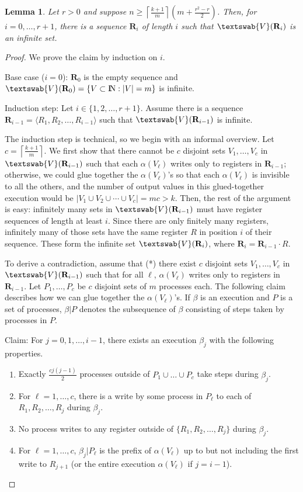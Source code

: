 \documentclass[11pt]{article}
\newtheorem{lemma}[theorem]{Lemma}
\newcommand{\gV}{\textswab{V}}
\newcommand{\bR}{\mathbf{R}}
\newcommand{\ceil}[1]{\left\lceil #1 \right\rceil}
\newcommand{\nat}{{\rm I\!N}}
\newcounter{ind}
\begin{document}
\begin{lemma}
\label{anonymous-gluing}
Let $r>0$ and
suppose $n\geq \ceil{\frac{k+1}{m}}(m+\frac{r^2-r}{2})$.  Then,
for $i=0,\ldots,r+1$, there is a sequence $\bR_i$ of length $i$ such that 
$\gV(\bR_i)$ is an infinite set.
\end{lemma}

\begin{proof}
We prove the claim by induction on $i$.  

Base case ($i=0$):  $\bR_0$ is the empty sequence and  $\gV(\bR_0) = \{V\subset \nat : |V|=m\}$ is infinite.

Induction step:  Let $i\in \{1,2,\ldots,r+1\}$.  Assume there is a sequence $\bR_{i-1}=\langle R_1, R_2, \ldots, R_{i-1}\rangle$ such that $\gV(\bR_{i-1})$ is infinite.

The induction step is  technical, so we begin with an informal overview.
Let $c=\ceil{\frac{k+1}{m}}$.
We first show that there cannot be $c$ disjoint sets $V_1,\ldots,V_c$ in $\gV(\bR_{i-1})$ such that each $\alpha(V_\ell)$ writes only to registers in $\bR_{i-1}$; otherwise, we could glue together the $\alpha(V_\ell)$'s so that each $\alpha(V_\ell)$ is invisible to all the others, and 
the number of  output values in this glued-together execution would be
$|V_1\cup V_2\cup \cdots \cup V_c| = mc >k$.
Then, the rest of the argument is easy:  infinitely many sets in
$\gV(\bR_{i-1})$ must have register sequences of length at least $i$.
Since there are only finitely many  registers, infinitely many of
those sets  have the same register $R$ in position $i$ of their
sequence.  These form the infinite set $\gV(\bR_i)$, 
where $\bR_i = \bR_{i-1}\cdot R$.

To derive a contradiction, assume that  
(*) there exist $c$ disjoint sets $V_1,\ldots,V_c$ in $\gV(\bR_{i-1})$ such that
for all $\ell$, $\alpha(V_\ell)$ writes only to registers in $\bR_{i-1}$.
Let $P_1,\ldots,P_c$ be $c$ disjoint sets of $m$ processes each.
The following claim describes how we can glue together the $\alpha(V_\ell)$'s.
If $\beta$ is an execution  and $P$ is a set of processes, $\beta|P$ denotes the subsequence of $\beta$ consisting of steps taken by processes in $P$.

\medskip

{\sc Claim:}  For $j=0,1,\ldots,i-1$, there exists an execution $\beta_j$ with the following properties.
\begin{enumerate}
\item
\label{process-bound}
Exactly $\frac{cj(j-1)}{2}$ processes outside of $P_1\cup \ldots\cup P_c$ take steps during $\beta_j$.
\item
\label{write-exists}
For $\ell = 1,\ldots,c$, there is a write by some process in $P_\ell$ to each of $R_1,R_2,\ldots,R_j$ during $\beta_j$.
\item
\label{writes-contained}
No process writes to any register outside of $\{R_1,R_2,\ldots,R_j\}$ during $\beta_j$.
\item
\label{indistinguishable}
For $\ell= 1,\ldots,c$, $\beta_j | P_\ell$ is the prefix of $\alpha(V_\ell)$ up to but not including the first write to $R_{j+1}$ (or the entire execution $\alpha(V_\ell)$ if $j=i-1$).
\end{enumerate}


\end{proof}
\end{document}
